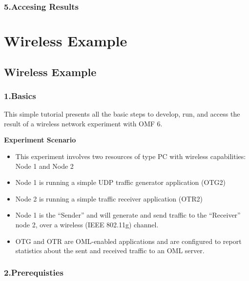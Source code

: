 \documentclass[letterpaper,10pt,english]{sphinxmanual}
\begin{document}
\subsection{5.Accesing Results}
\label{omf_example:accesing-results}

\chapter{Wireless Example}
\label{index:wireless-example}

\section{Wireless Example}
\label{wireless_example::doc}\label{wireless_example:wireless-example}

\subsection{1.Basics}
\label{wireless_example:basics}
This simple tutorial presents all the basic steps to develop, run, and access the result of a wireless network experiment with OMF 6.

\textbf{Experiment Scenario}
\begin{itemize}
\item {} 
This experiment involves two resources of type PC with wireless capabilities: Node 1 and Node 2

\item {} 
Node 1 is running a simple UDP traffic generator application (OTG2)

\item {} 
Node 2 is running a simple traffic receiver application (OTR2)

\item {} 
Node 1 is the “Sender” and will generate and send traffic to the “Receiver” node 2, over a wireless (IEEE 802.11g) channel.

\item {} 
OTG and OTR are OML-enabled applications and are configured to report statistics about the sent and received traffic to an OML server.

\end{itemize}


\subsection{2.Prerequisties}
\label{wireless_example:prerequisties}
\end{document}
